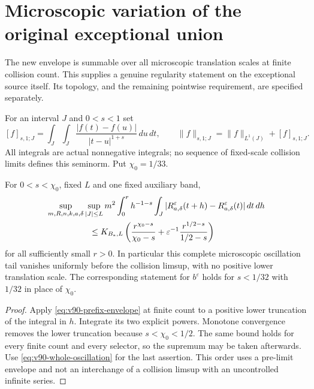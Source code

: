 \section{Microscopic variation of the original exceptional union}
\label{sec:v90-fractional}
The new envelope is summable over all microscopic translation scales
at finite collision count. This supplies a genuine regularity statement
on the exceptional source itself. Its topology, and the remaining
pointwise requirement, are specified separately.

For an interval $J$ and $0<s<1$ set
\begin{equation}\label{eq:v90-gagliardo}
 [f]_{s,1;J}=\int_J\int_J
          \frac{|f(t)-f(u)|}{|t-u|^{1+s}}\,du\,dt,\qquad
 \|f\|_{s,1;J}=\|f\|_{L^1(J)}+[f]_{s,1;J}.
\end{equation}
All integrals are actual nonnegative integrals; no sequence of
fixed-scale collision limits defines this seminorm. Put $\chi_0=1/33$.

\begin{theorem}
\label{thm:v90-oscillation-tail}
For $0<s<\chi_0$, fixed $L$ and one fixed auxiliary band,
\begin{align}
 &\sup_{m,R,n,k,a,\delta}\sup_{|J|\le L}m^2
 \int_0^r h^{-1-s}\int_J
 |R_{a,\delta}^\varepsilon(t+h)-R_{a,\delta}^\varepsilon(t)|\,dt\,dh
 \notag\\
 &\hspace{18mm}\le K_{B_*,L}
       \left(\frac{r^{\chi_0-s}}{\chi_0-s}
           +\varepsilon^{-1}\frac{r^{1/2-s}}{1/2-s}\right)
                                                    \label{eq:v90-tail}
\end{align}
for all sufficiently small $r>0$. In particular this complete
microscopic oscillation tail vanishes uniformly before the collision
limsup, with no positive lower translation scale. The corresponding
statement for $b^\varepsilon$ holds for $s<1/32$ with $1/32$ in
place of $\chi_0$.
\end{theorem}
\begin{proof}
Apply \eqref{eq:v90-prefix-envelope} at finite count to a positive
lower truncation of the integral in $h$. Integrate its two explicit
powers. Monotone convergence removes the lower truncation because
$s<\chi_0<1/2$. The same bound holds for every finite count and every
selector, so the supremum may be taken afterwards. Use
\eqref{eq:v90-whole-oscillation} for the last assertion. This order
uses a pre-limit envelope and not an interchange of a collision limsup
with an uncontrolled infinite series.
\end{proof}


